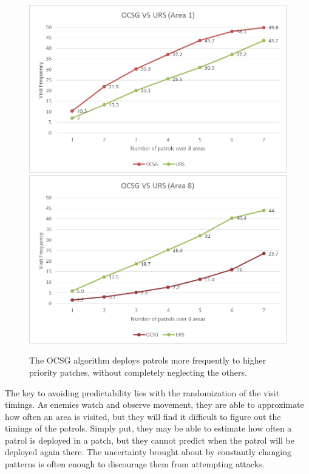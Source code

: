 \documentclass[journal]{./IEEE/IEEEtran}
\begin{document}
\begin{figure}
\begin{center}
\includegraphics[scale=0.45]{./Images/image027.png}
\includegraphics[scale=0.45]{./Images/image029.png}
\caption{The OCSG algorithm deploys patrols more frequently to higher priority patches, without completely neglecting the others.}
\end{center}
\end{figure}

The key to avoiding predictability lies with the randomization of the visit timings. As enemies watch and observe movement, they are able to approximate how often an area is visited, but they will find it difficult to figure out the timings of the patrols. Simply put, they may be able to estimate how often a patrol is deployed in a patch, but they cannot predict when the patrol will be deployed again there. The uncertainty brought about by constantly changing patterns is often enough to discourage them from attempting attacks.
\end{document}
